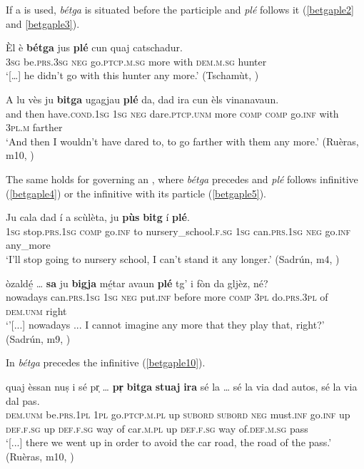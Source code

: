If a  is used, \textit{bétga} is situated before the participle and \textit{plé} follows it (\ref{betgaple2} and \ref{betgaple3}).

\ea
\label{betgaple2}
\gll   Èl è \textbf{bétga} jus \textbf{plé} cun quaj catschadur. \\
\textsc{3sg} be.\textsc{prs.3sg} \textsc{neg} go.\textsc{ptcp.m.sg} more with \textsc{dem.m.sg} hunter\\
\glt `[…] he didn’t go with this hunter any more.' (Tschamùt, \citealt[12]{Büchli1966})
\z

\ea\label{betgaple3}
\gll  A lu vès ju \textbf{bitga} ugagjau \textbf{plé} da, dad ira cun èls vinanavaun.\\
and then have.\textsc{cond.1sg} \textsc{1sg} \textsc{neg} dare.\textsc{ptcp.unm} more \textsc{comp} \textsc{comp} go.\textsc{inf} with \textsc{3pl.m} farther\\
\glt `And then I wouldn’t have dared to, to go farther with them any more.' (Ruèras, m10, )
\z

The same holds for  governing an , where \textit{bétga} precedes and \textit{plé} follows infinitive (\ref{betgaple4}) or the infinitive with its particle (\ref{betgaple5}).

\ea
\label{betgaple4}
\gll  Ju cala dad í a scùlèta, ju \textbf{pùs} \textbf{bitg} í \textbf{plé}.\\
\textsc{1sg} stop.\textsc{prs.1sg} \textsc{comp} go.\textsc{inf} to nursery\_school.\textsc{f.sg} \textsc{1sg} can.\textsc{prs.1sg} \textsc{neg} go.\textsc{inf} any\_more  \\
\glt `I’ll stop going to nursery school, I can’t stand it any longer.' (Sadrún, m4, )
\z

\ea
\label{betgaple5}
\gll [...] òzaldé̱ … \textbf{sa} ju \textbf{bigja} mé̱tar avaun \textbf{plé} tg’ i fòn da gljèz, né?    \\
{} nowadays {} can.\textsc{prs.1sg} \textsc{1sg} \textsc{neg} put.\textsc{inf} before more \textsc{comp} \textsc{3pl} do.\textsc{prs.3pl} of \textsc{dem.unm} right \\
\glt `'[...] nowadays ... I cannot imagine any more that they play that, right?' (Sadrún, m9, )
\z

In  \textit{bétga} precedes the infinitive (\ref{betgaple10}).

\ea
\label{betgaple10}
\gll  [...] quaj èssan nuṣ i sé pr̩ … \textbf{pr̩} \textbf{bitga} \textbf{stuaj} \textbf{ira} sé la … sé la via dad autos, sé la via dal pas. \\
{} \textsc{dem.unm} be.\textsc{prs.1pl} \textsc{1pl} go.\textsc{ptcp.m.pl} up \textsc{subord} {} \textsc{subord} \textsc{neg} must.\textsc{inf} go.\textsc{inf} up \textsc{def.f.sg} {} up \textsc{def.f.sg} way of car.\textsc{m.pl} up \textsc{def.f.sg} way of.\textsc{def.m.sg} pass  \\
\glt `[...] there we went up in order to avoid the car road, the road of the pass.' (Ruèras, m10, )
\z

